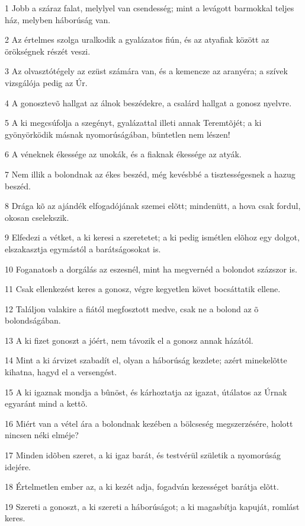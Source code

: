 \par 1 Jobb a száraz falat, melylyel van csendesség; mint a levágott barmokkal teljes ház, melyben háborúság van.
\par 2 Az értelmes szolga uralkodik a gyalázatos fiún, és az atyafiak között az örökségnek részét veszi.
\par 3 Az olvasztótégely az ezüst számára van, és a kemencze az aranyéra; a szívek vizsgálója pedig az Úr.
\par 4 A gonosztevõ hallgat az álnok beszédekre, a csalárd hallgat a gonosz nyelvre.
\par 5 A ki megcsúfolja a szegényt, gyalázattal illeti annak Teremtõjét; a ki gyönyörködik másnak nyomorúságában, büntetlen  nem lészen!
\par 6 A véneknek ékessége az unokák, és a fiaknak ékessége az atyák.
\par 7 Nem illik a bolondnak az ékes beszéd, még kevésbbé a tisztességesnek a hazug beszéd.
\par 8 Drága kõ az ajándék elfogadójának szemei elõtt; mindenütt, a hova csak fordul, okosan cselekszik.
\par 9 Elfedezi a vétket, a ki keresi a szeretetet; a ki pedig ismétlen elõhoz egy dolgot, elszakasztja egymástól a barátságosokat is.
\par 10 Foganatosb a dorgálás az eszesnél, mint ha megvernéd a bolondot százszor is.
\par 11 Csak ellenkezést keres a gonosz, végre kegyetlen követ bocsáttatik ellene.
\par 12 Találjon valakire a fiától megfosztott medve, csak ne a bolond az õ bolondságában.
\par 13 A ki fizet gonoszt a jóért, nem távozik el a gonosz annak házától.
\par 14 Mint a ki árvizet szabadít el, olyan a háborúság kezdete; azért minekelõtte kihatna, hagyd el a versengést.
\par 15 A ki igaznak mondja a bûnöst, és kárhoztatja az igazat, útálatos az Úrnak egyaránt mind a kettõ.
\par 16 Miért van a vétel ára a bolondnak kezében a bölcseség megszerzésére, holott nincsen néki elméje?
\par 17 Minden idõben szeret, a ki igaz barát, és testvérül születik  a nyomorúság idejére.
\par 18 Értelmetlen ember az, a ki kezét adja, fogadván kezességet barátja elõtt.
\par 19 Szereti a gonoszt, a ki szereti a háborúságot; a ki magasbítja kapuját, romlást keres.
